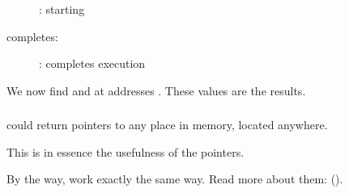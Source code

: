 \begin{figure}[H]
\centering
{}
\caption{\olly: \ttfone starting}
\label{fig:pointers_olly_stk_2}
\end{figure}

\clearpage
\ttfone completes:

\begin{figure}[H]
\centering
{}
\caption{\olly: \ttfone completes execution}
\label{fig:pointers_olly_stk_3}
\end{figure}

We now find  and  at addresses \PtrsAddresses.
These values are the \ttfone results.

\subsubsection{\Conclusion{}}
 
\ttfone could return pointers to any place in memory, located anywhere.

This is in essence the usefulness of the pointers.

By the way, \Cpp {} work exactly the
same way. Read more about them: ().
